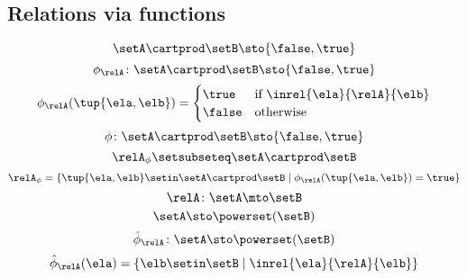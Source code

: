\begin{forslides}
\subsection{Relations via functions}

\begin{equation}\label{eq:slides_session2_rel_110}
\setA \cartprod \setB \sto \{ \false, \true \}
\end{equation}
 \begin{equation}\label{eq:slides_session2_rel_111}
\phi_{\relA} \colon \setA \cartprod \setB \sto \{ \false, \true \}
\end{equation}
\begin{equation}\label{eq:slides_session2_rel_112}
\phi_{\relA}(\tup{\ela, \elb}) =
              \begin{cases}
                  \true  & \text{if } \inrel{\ela}{\relA}{\elb} \\
                  \false & \text{otherwise} 
              \end{cases}
\end{equation}
 \begin{equation}\label{eq:slides_session2_rel_113}
\phi\colon \setA \cartprod \setB \sto \{ \false, \true \}
\end{equation}
\begin{equation}\label{eq:slides_session2_rel_114}
\relA_{\phi} \setsubseteq \setA \cartprod \setB
\end{equation}
 \begin{equation}\label{eq:slides_session2_rel_115}
\relA_{\phi} = \{ \tup{\ela, \elb} \setin \setA \cartprod \setB \mid \phi_{\relA}(\tup{\ela, \elb}) = \true \}
\end{equation}
\begin{equation}\label{eq:slides_session2_rel_116}
\relA \colon \setA \mto \setB
\end{equation}
 \begin{equation}\label{eq:slides_session2_rel_117}
\setA  \sto \powerset (\setB)
\end{equation}
\begin{equation}\label{eq:slides_session2_rel_118}
\hat \phi_{\relA} \colon \setA \sto \powerset (\setB)
\end{equation}
 \begin{equation}\label{eq:slides_session2_rel_119}
\hat \phi_{\relA} (\ela) = \{ \elb \setin \setB \mid \inrel{\ela}{\relA}{\elb}\}

\end{equation}
\end{forslides}
